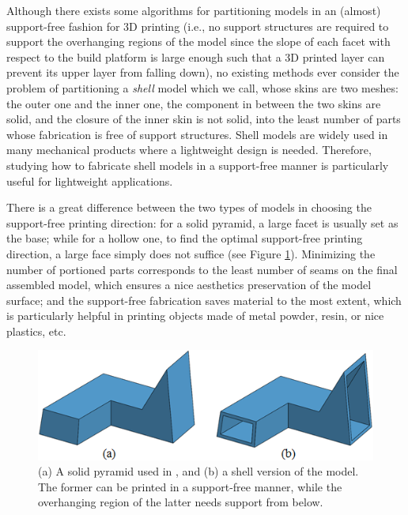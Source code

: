 {{Although there exists some algorithms for partitioning models in an (almost) support-free fashion \cite{Hu_siga14} for 3D printing ({\color{red}i.e., no support structures are required to support the overhanging regions of the model since the slope of each facet with respect to the build platform is large enough such that a 3D printed layer can prevent its upper layer from falling down}), no existing methods ever consider the problem of partitioning a \emph{shell} model which we call, {\color{red} whose skins are two meshes: the outer one and the inner one, the component in between the two skins are solid, and the closure of the inner skin is not solid}, into the least number of parts whose fabrication is free of support structures. { {Shell models are widely used in many mechanical products where a lightweight design is needed. Therefore, studying how to fabricate shell models in a support-free manner is particularly useful for lightweight applications.}}



There is a great difference between the two types of models in choosing the support-free printing direction: for a solid pyramid, a large facet is usually set as the base; while for a hollow one, to find the optimal support-free printing direction, a large face simply does not suffice (see Figure \ref{fig:solid_hollow}). Minimizing the number of portioned parts corresponds to the least number of seams on the final assembled model, which ensures a nice aesthetics preservation of the model surface; and the support-free fabrication saves material to the most extent, which is particularly helpful in printing objects made of metal powder, resin, or nice plastics, etc.}}

\begin{figure}[t!]
  \centering
  \includegraphics[width=\linewidth]{figs/solid_hollow.png}
  \caption{\label{fig:solid_hollow}%
  (a) A solid pyramid used in \cite{Hu_siga14}, and (b) a shell version of the model. The former can be printed in a support-free manner, while {\color{red}the overhanging region} of the latter needs support from below.}
\end{figure}

